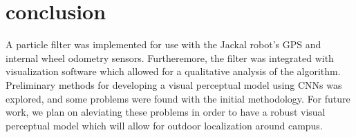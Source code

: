 \documentclass[letterpaper, 12 pt, conference]{ieeeconf}  %
\begin{document}
\section{conclusion}

A particle filter was implemented for use with the Jackal robot's GPS and internal wheel odometry sensors. Furtheremore, the filter was integrated with visualization software which allowed for a qualitative analysis of the algorithm. Preliminary methods for developing a visual perceptual model using CNNs was explored, and some problems were found with the initial methodology. For future work, we plan on aleviating these problems in order to have a robust visual perceptual model which will allow for outdoor localization around campus. 




\addtolength{\textheight}{-12cm}   %







\end{document}
